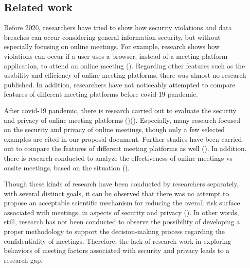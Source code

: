 \begin{spacing}{1.0}
    \subsection{Related work}
    \indent \par Before 2020, researchers have tried to show how security violations and data breaches can occur considering general information security, but without especially focusing on online meetings. For example, research shows how violations can occur if a user uses a browser, instead of a meeting platform application, to attend an online meeting (\cite{kumar2017}). Regarding other features such as the usability and efficiency of online meeting platforms, there was almost no research published. In addition, researchers have not noticeably attempted to compare features of different meeting platforms before covid-19 pandemic.
    \par After covid-19 pandemic, there is research carried out to evaluate the security and privacy of online meeting platforms (\cite{hasan2021})(\cite{isobe2021}). Especially, many research focused on the security and privacy of online meetings, though only a few selected examples are cited in our proposal document. Further studies have been carried out to compare the features of different meeting platforms as well (\cite{arishina2022}). In addition, there is research conducted to analyze the effectiveness of online meetings vs onsite meetings, based on the situation (\cite{karl2021}).
    \par Though these kinds of research have been conducted by researchers separately, with several distinct goals, it can be observed that there was no attempt to propose an acceptable scientific mechanism for reducing the overall risk surface associated with meetings, in aspects of security and privacy (\cite{tondel2022}). In other words, still, research has not been conducted to observe the possibility of developing a proper methodology to support the decision-making process regarding the confidentiality of meetings. Therefore, the lack of research work in exploring behaviors of meeting factors associated with security and privacy leads to a research gap.


\end{spacing}
